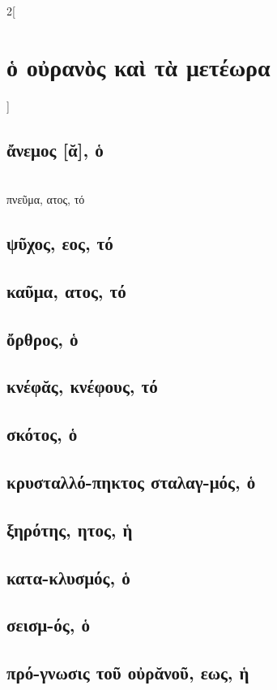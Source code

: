 \documentclass{book}
\begin{document}
\begin{multicols}{2}[\section{ὁ οὐρανὸς καὶ τὰ μετέωρα}]
\subsection{ἄνεμος [ᾰ], ὁ}
 ~\\
πνεῦμα, ατος, τό 
\subsection{ψῦχος, εος, τό}
\subsection{καῦμα, ατος, τό}
\subsection{ὄρθρος, ὁ}
\subsection{κνέφᾰς, κνέφους, τό}
\subsection{σκότος, ὁ}
\subsection{κρυσταλλό-πηκτος σταλαγ-μός, ὁ}
\subsection{ξηρότης, ητος, ἡ}
\subsection{κατα-κλυσμός, ὁ}
\subsection{σεισμ-ός, ὁ}
\subsection{πρό-γνωσις τοῦ οὐρᾰνοῦ, εως, ἡ}
~
\end{multicols}
\end{document}
